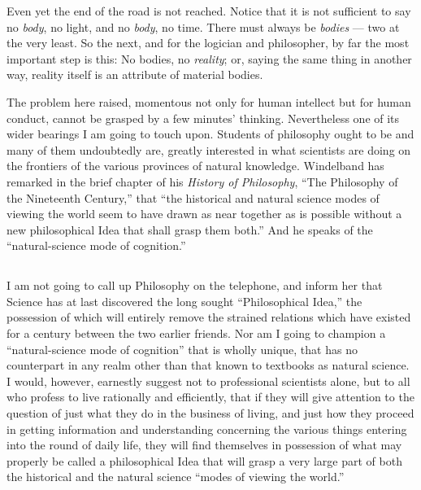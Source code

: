\documentclass[a4paper, 11pt, oneside, polutonikogreek, english]{article}
\begin{document}
Even yet the end of the road is not reached. Notice that it is not sufficient to say no \emph{body}, no light, and no \emph{body}, no time. There must always be \emph{bodies} --- two at the very least. So the next, and for the logician and philosopher, by far the most important step is this: No bodies, no \emph{reality}; or, saying the same thing in another way, reality itself is an attribute of material bodies.

The problem here raised, momentous not only for human intellect but for human conduct, cannot be grasped by a few minutes' thinking. Nevertheless one of its wider bearings I am going to touch upon. Students of philosophy ought to be and many of them undoubtedly are, greatly interested in what scientists are doing on the frontiers of the various provinces of natural knowledge. Windelband has remarked in the brief chapter of his \emph{History of Philosophy}, ``The Philosophy of the Nineteenth Century,'' that ``the historical and natural science modes of viewing the world seem to have drawn as near together as is possible without a new philosophical Idea that shall grasp them both.'' And he speaks of the ``natural-science mode of cognition.''

\subsection{}
\paragraph{}
I am not going to call up Philosophy on the telephone, and inform her that Science has at last discovered the long sought ``Philosophical Idea,'' the possession of which will entirely remove the strained relations which have existed for a century between the two earlier friends. Nor am I going to champion a ``natural-science mode of cognition'' that is wholly unique, that has no counterpart in any realm other than that known to textbooks as natural science. I would, however, earnestly suggest not to professional scientists alone, but to all who profess to live rationally and efficiently, that if they will give attention to the question of just what they do in the business of living, and just how they proceed in getting information and understanding concerning the various things entering into the round of daily life, they will find themselves in possession of what may properly be called a philosophical Idea that will grasp a very large part of both the historical and the natural science ``modes of viewing the world.''
\end{document}
